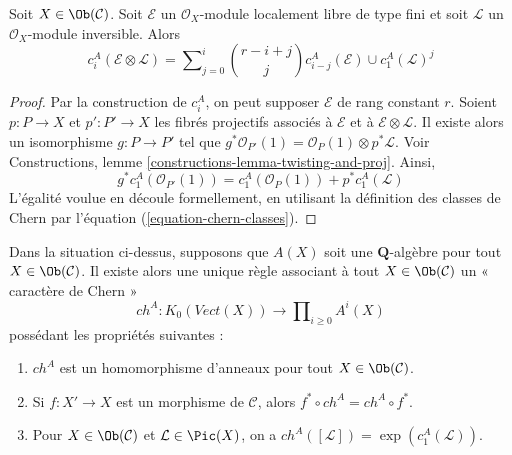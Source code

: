 \begin{lemma}
\label{lemma-chern-classes-E-tensor-L}
Soit $X \in \Ob(\mathcal{C})$. Soit $\mathcal{E}$ un
$\mathcal{O}_X$-module localement libre de type fini et soit $\mathcal{L}$ un
$\mathcal{O}_X$-module inversible. Alors
$$
c^A_i({\mathcal E} \otimes {\mathcal L})
=
\sum\nolimits_{j = 0}^i
\binom{r - i + j}{j} c^A_{i - j}({\mathcal E}) \cup c^A_1({\mathcal L})^j
$$
\end{lemma}

\begin{proof}
Par la construction de $c^A_i$, on peut supposer $\mathcal{E}$
de rang constant $r$. Soient $p : P \to X$ et $p' : P' \to X$
les fibrés projectifs associés à $\mathcal{E}$ et à
$\mathcal{E} \otimes \mathcal{L}$.
Il existe alors un isomorphisme $g : P \to P'$ tel que
$g^*\mathcal{O}_{P'}(1) = \mathcal{O}_P(1) \otimes p^*\mathcal{L}$.
Voir Constructions, lemme \ref{constructions-lemma-twisting-and-proj}.
Ainsi,
$$
g^*c_1^A(\mathcal{O}_{P'}(1)) =
c_1^A(\mathcal{O}_P(1)) + p^*c_1^A(\mathcal{L})
$$
L'égalité voulue en découle formellement, en utilisant la définition
des classes de Chern par l'équation (\ref{equation-chern-classes}).
\end{proof}

\begin{proposition}
\label{proposition-chern-character}
Dans la situation ci-dessus, supposons que $A(X)$ soit une $\mathbf{Q}$-algèbre pour tout
$X \in \Ob(\mathcal{C})$. Il existe alors une unique règle associant
à tout $X \in \Ob(\mathcal{C})$ un « caractère de Chern »
$$
ch^A : K_0(\textit{Vect}(X)) \longrightarrow
\prod\nolimits_{i \geq 0} A^i(X)
$$
possédant les propriétés suivantes :
\begin{enumerate}
\item $ch^A$ est un homomorphisme d'anneaux pour tout $X \in \Ob(\mathcal{C})$.
\item Si $f : X' \to X$ est un morphisme de $\mathcal{C}$, alors
$f^* \circ ch^A =  ch^A \circ f^*$.
\item Pour $X \in \Ob(\mathcal{C})$ et $\mathcal{L} \in \Pic(X)$,
on a $ch^A([\mathcal{L}]) = \exp(c_1^A(\mathcal{L}))$.
\end{enumerate}
\end{proposition}

